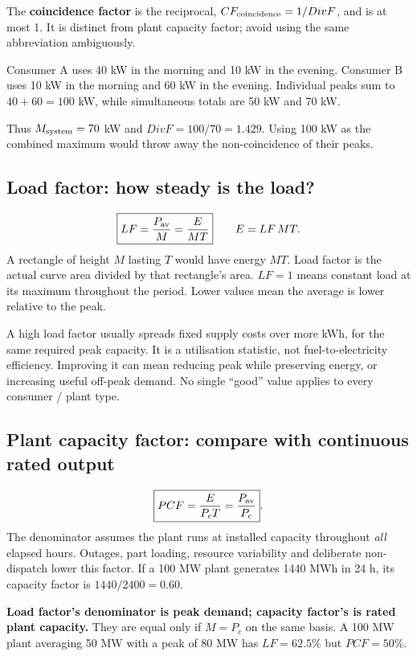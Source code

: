 \documentclass[11pt,a4paper]{article}
\newenvironment{Worked}[1]{\begin{tcolorbox}[breakable=false,colback=white,colframe=teal,colbacktitle=pale,coltitle=ink,title={#1}]}{\end{tcolorbox}}
\begin{document}
The \textbf{coincidence factor} is the reciprocal, $CF_{\rm coincidence}=1/DivF$, and is at most 1. It is distinct from plant capacity factor; avoid using the same abbreviation ambiguously.

\begin{Worked}{A time-based explanation of diversity}
Consumer A uses 40 kW in the morning and 10 kW in the evening. Consumer B uses 10 kW in the morning and 60 kW in the evening. Individual peaks sum to $40+60=100$ kW, while simultaneous totals are 50 kW and 70 kW.\par
Thus $M_{\rm system}=70$ kW and $DivF=100/70=1.429$. Using 100 kW as the combined maximum would throw away the non-coincidence of their peaks.
\end{Worked}

\subsection{Load factor: how steady is the load?}
\[
\boxed{LF=\frac{P_{\rm av}}{M}=\frac{E}{M T}}\qquad E=LF\,M T.
\]
A rectangle of height $M$ lasting $T$ would have energy $MT$. Load factor is the actual curve area divided by that rectangle's area. $LF=1$ means constant load at its maximum throughout the period. Lower values mean the average is lower relative to the peak.

A high load factor usually spreads fixed supply costs over more kWh, for the same required peak capacity. It is a utilisation statistic, not fuel-to-electricity efficiency. Improving it can mean reducing peak while preserving energy, or increasing useful off-peak demand. No single ``good'' value applies to every consumer / plant type.

\subsection{Plant capacity factor: compare with continuous rated output}
\[
\boxed{PCF=\frac{E}{P_c T}=\frac{P_{\rm av}}{P_c}}.
\]
The denominator assumes the plant runs at installed capacity throughout \emph{all} elapsed hours. Outages, part loading, resource variability and deliberate non-dispatch lower this factor. If a 100 MW plant generates 1440 MWh in 24 h, its capacity factor is $1440/2400=0.60$.

\textbf{Load factor's denominator is peak demand; capacity factor's is rated plant capacity.} They are equal only if $M=P_c$ on the same basis. A 100 MW plant averaging 50 MW with a peak of 80 MW has $LF=62.5\%$ but $PCF=50\%$.
\end{document}

